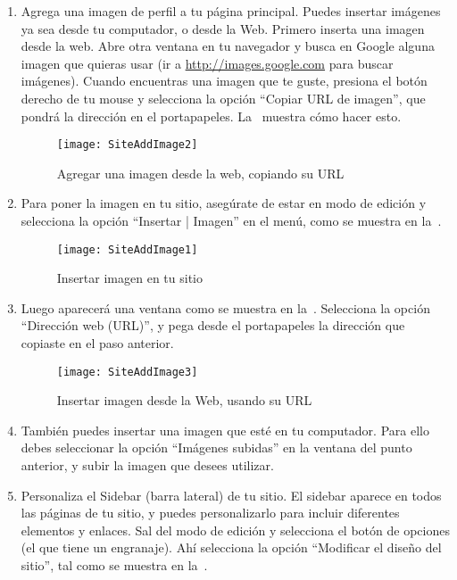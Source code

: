 \begin{enumerate}
\item Agrega una imagen de perfil a tu página principal. Puedes
  insertar imágenes ya sea desde tu computador, o desde la
  Web. Primero inserta una imagen desde la web. Abre otra ventana en
  tu navegador y busca en Google alguna imagen que quieras usar (ir a
  \url{http://images.google.com} para buscar imágenes). Cuando
  encuentras una imagen que te guste, presiona el botón derecho de tu
  mouse y selecciona la opción ``Copiar URL de imagen'', que pondrá la
  dirección en el portapapeles. La~ muestra
  cómo hacer esto.

\begin{figure}[H]
\centering
\texttt{[image: SiteAddImage2]}
\caption{Agregar una imagen desde la web, copiando su URL}
\label{fig:SiteAddImage2}
\end{figure}

\item Para poner la imagen en tu sitio, asegúrate de estar en modo de
  edición y selecciona la opción ``Insertar | Imagen'' en el menú,
  como se muestra en la~.

\begin{figure}[H]
\centering
\texttt{[image: SiteAddImage1]}
\caption{Insertar imagen en tu sitio}
\label{fig:SiteAddImage1}
\end{figure}

\item Luego aparecerá una ventana como se muestra en
  la~. Selecciona la opción ``Dirección web
  (URL)'', y pega desde el portapapeles la dirección que copiaste en
  el paso anterior.

\begin{figure}[H]
\centering
\texttt{[image: SiteAddImage3]}
\caption{Insertar imagen desde la Web, usando su URL}
\label{fig:SiteAddImage3}
\end{figure}

\item También puedes insertar una imagen que esté en tu
  computador. Para ello debes seleccionar la opción ``Imágenes
  subidas'' en la ventana del punto anterior, y subir la imagen que
  desees utilizar.

\item Personaliza el Sidebar (barra lateral) de tu sitio. El sidebar
  aparece en todos las páginas de tu sitio, y puedes personalizarlo
  para incluir diferentes elementos y enlaces. Sal del modo de edición
  y selecciona el botón de opciones (el que tiene un engranaje). Ahí
  selecciona la opción ``Modificar el diseño del sitio'', tal como se
  muestra en la~.


\end{enumerate}
